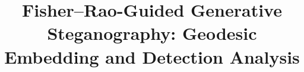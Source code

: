 \documentclass[a4paper,fleqn]{cas-dc}
\begin{document}
\linenumbers
\let\WriteBookmarks\relax
\def\floatpagepagefraction{1}
\def\textpagefraction{.001}



\title [mode = title]{Fisher--Rao-Guided Generative Steganography: Geodesic Embedding and Detection Analysis}  



%
\end{document}
